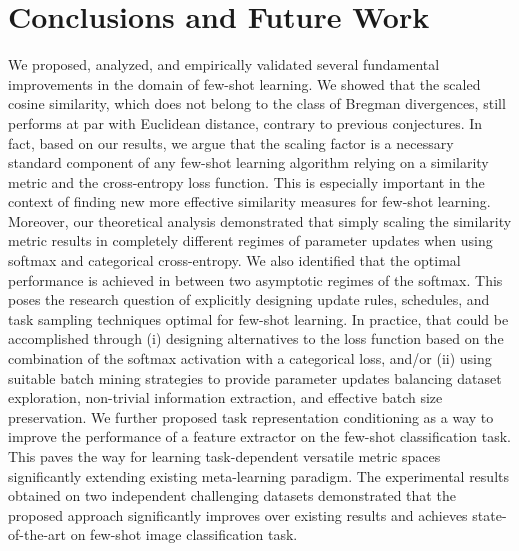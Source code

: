 \documentclass{article}
\begin{document}
\section{Conclusions and Future Work} \label{sec:conclusions}
We proposed, analyzed, and empirically validated several fundamental improvements in the domain of few-shot learning. We showed that the scaled cosine similarity, which does not belong to the class of Bregman divergences, still performs at par with Euclidean distance, contrary to previous conjectures. In fact, based on our results, we argue that the scaling factor is a necessary standard component of any few-shot learning algorithm relying on a similarity metric and the cross-entropy loss function. This is especially important in the context of finding new more effective similarity measures for few-shot learning. Moreover, our theoretical analysis demonstrated that simply scaling the similarity metric results in completely different regimes of parameter updates when using softmax and categorical cross-entropy. We also identified that the optimal performance is achieved in between two asymptotic regimes of the softmax. This poses the research question of explicitly designing update rules, schedules, and task sampling techniques optimal for few-shot learning. In practice, that could be accomplished through (i) designing alternatives to the loss function based on the combination of the softmax activation with a categorical loss, and/or (ii) using suitable batch mining strategies to provide parameter updates balancing dataset exploration, non-trivial information extraction, and effective batch size preservation. We further proposed task representation conditioning as a way to improve the performance of a feature extractor on the few-shot classification task. This paves the way for learning task-dependent versatile metric spaces significantly extending existing meta-learning paradigm. The experimental results obtained on two independent challenging datasets demonstrated that the proposed approach significantly improves over existing results and achieves state-of-the-art on few-shot image classification task.  
\end{document}
